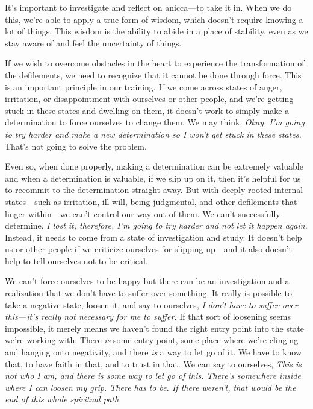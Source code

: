 It's important to investigate and reflect on anicca---to take it in. 
When we do this, we're able to apply a true form of wisdom, which 
doesn't require knowing a lot of things. This wisdom is the ability to 
abide in a place of stability, even as we stay aware of and feel the 
uncertainty of things.


If we wish to overcome obstacles in the heart to experience the 
transformation of the defilements, we need to recognize that it cannot 
be done through force. This is an important principle in our training. 
If we come across states of anger, irritation, or disappointment with 
ourselves or other people, and we're getting stuck in these states and 
dwelling on them, it doesn't work to simply make a determination to 
force ourselves to change them. We may think, \emph{Okay, I'm going to 
try harder and make a new determination so I won't get stuck in these 
states.} That's not going to solve the problem.

Even so, when done properly, making a determination can be extremely 
valuable and when a determination is valuable, if we slip up on it, 
then it's helpful for us to recommit to the determination straight 
away. But with deeply rooted internal states---such as irritation, ill 
will, being judgmental, and other defilements that linger within---we 
can't control our way out of them. We can't successfully determine, 
\emph{I lost it, therefore, I'm going to try harder and not let it 
happen again.} Instead, it needs to come from a state of investigation 
and study. It doesn't help us or other people if we criticize ourselves 
for slipping up---and it also doesn't help to tell ourselves not to be 
critical.

We can't force ourselves to be happy but there can be an investigation 
and a realization that we don't have to suffer over something. It 
really is possible to take a negative state, loosen it, and say to 
ourselves, \emph{I don't have to suffer over this---it's really not 
necessary for me to suffer.} If that sort of loosening seems 
impossible, it merely means we haven't found the right entry point into 
the state we're working with. There \emph{is} some entry point, some 
place where we're clinging and hanging onto negativity, and there 
\emph{is} a way to let go of it. We have to know that, to have faith in 
that, and to trust in that. We can say to ourselves, \emph{This is not 
who I am, and there is some way to let go of this. There's somewhere 
inside where I can loosen my grip. There has to be. If there weren't, 
that would be the end of this whole spiritual path.}


